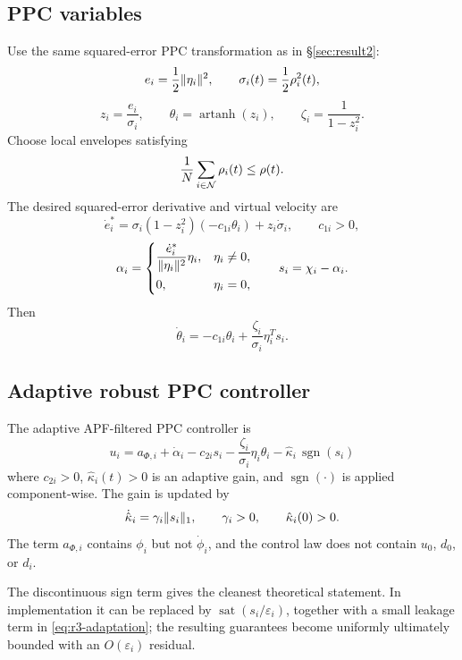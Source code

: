 \subsection{PPC variables}

Use the same squared-error PPC transformation as in \S\ref{sec:result2}:
\[
e_i=\frac12\lVert \eta_i \rVert^2,\qquad
\sigma_i(t)=\frac12\rho_i^2(t),
\]
\[
z_i=\frac{e_i}{\sigma_i},\qquad
\theta_i=\operatorname{artanh}(z_i),\qquad
\zeta_i=\frac{1}{1-z_i^2}.
\]
Choose local envelopes satisfying
\[
\frac1N\sum_{i\in\mathcal{N}}\rho_i(t)\le \rho(t).
\]
The desired squared-error derivative and virtual velocity are
\[
\dot e_i^*
=\sigma_i(1-z_i^2)(-c_{1i}\theta_i)+z_i\dot\sigma_i,
\qquad c_{1i}>0,
\]
\begin{equation}
\alpha_i=
\begin{cases}
\displaystyle
\frac{\dot e_i^*}{\lVert \eta_i \rVert^2}\eta_i, & \eta_i\neq0,\\[8pt]
0, & \eta_i=0,
\end{cases}
\qquad
s_i=\chi_i-\alpha_i .
\label{eq:r3-alpha-s}
\end{equation}
Then
\[
\dot\theta_i
=-c_{1i}\theta_i+\frac{\zeta_i}{\sigma_i}\eta_i^Ts_i.
\]

\subsection{Adaptive robust PPC controller}

The adaptive APF-filtered PPC controller is
\begin{equation}
\boxed{
u_i=a_{\Phi,i}+\dot\alpha_i
-c_{2i}s_i
-\frac{\zeta_i}{\sigma_i}\eta_i\theta_i
-\hat\kappa_i\,\operatorname{sgn}(s_i)
}
\label{eq:r3-ui}
\end{equation}
where $c_{2i}>0$, $\hat\kappa_i(t)>0$ is an adaptive gain, and
$\operatorname{sgn}(\cdot)$ is applied component-wise.  The gain is updated
by
\begin{equation}
\dot{\hat\kappa}_i=\gamma_i\lVert s_i \rVert_1,\qquad
\gamma_i>0,\qquad
\hat\kappa_i(0)>0.
\label{eq:r3-adaptation}
\end{equation}
The term $a_{\Phi,i}$ contains $\phi_i$ but not $\dot\phi_i$, and the
control law does not contain $u_0$, $d_0$, or $d_i$.

\begin{remark}
The discontinuous sign term gives the cleanest theoretical statement.  In
implementation it can be replaced by
$\operatorname{sat}(s_i/\varepsilon_i)$, together with a small leakage term
in \eqref{eq:r3-adaptation}; the resulting guarantees become uniformly
ultimately bounded with an $O(\varepsilon_i)$ residual.
\end{remark}

